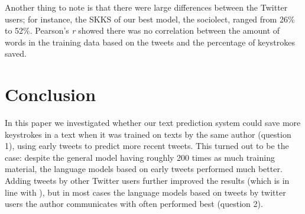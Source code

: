 \documentclass[11pt]{article}
\begin{document}
Another thing to note is that there were large differences between the Twitter users; for instance, the SKKS of our best model, the sociolect, ranged from 26\% to 52\%. Pearson's \emph{r} showed there was no correlation between the amount of words in the training data based on the tweets and the percentage of keystrokes saved.

\section{Conclusion}
In this paper we investigated whether our text prediction system could save more keystrokes in a text when it was trained on texts by the same author (question 1), using early tweets to predict more recent tweets. This turned out to be the case: despite the general model having roughly 200 times as much training material, the language models based on early tweets performed much better. Adding tweets by other Twitter users further improved the results (which is in line with \cite{verberne12}), but in most cases the language models based on tweets by twitter users the author communicates with often performed best (question 2).



\end{document}
